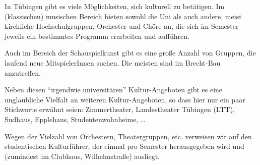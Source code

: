 
In Tübingen gibt es viele Möglichkeiten, sich kulturell zu
  betätigen.  Im (klassischen) musischen Bereich bieten sowohl die
  Uni als auch andere, meist kirchliche Hochschulgruppen, Orchester und
  Chöre an, die sich im Semester jeweils ein bestimmtes Programm
  erarbeiten und aufführen.

Auch im Bereich der Schauspielkunst gibt es eine große Anzahl von Gruppen,
  die laufend neue MitspielerInnen suchen.  Die meisten sind im
  Brecht-Bau anzutreffen.

Neben diesen "`irgendwie universitären"' Kultur-Angeboten gibt es eine
  unglaubliche Vielfalt an weiteren Kultur-Angeboten, so dass hier nur
  ein paar Stichworte erwähnt seien:  Zimmertheater, Landestheater Tübingen (LTT), Sudhaus,
  Epplehaus, Studentenwohnheime, \dots

Wegen der Vielzahl von Orchestern, Theatergruppen, etc. verweisen wir
  auf den studentischen Kulturführer, der einmal pro Semester
  herausgegeben wird und (zumindest im Clubhaus, Wilhelmstraße)
  ausliegt.
